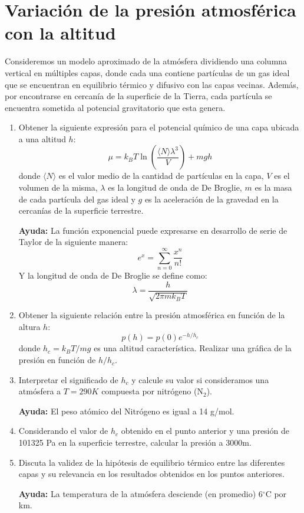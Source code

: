 \documentclass[a4paper,11pt]{article}
\begin{document}
\section{Variación de la presión atmosférica con la altitud}

Consideremos un modelo aproximado de la atmósfera dividiendo una
columna vertical en múltiples capas, donde cada una contiene partículas
de un gas ideal que se encuentran en equilibrio térmico y difusivo con
las capas vecinas. Además, por encontrarse en cercanía de la superficie
de la Tierra, cada partícula se encuentra sometida al potencial
gravitatorio que esta genera.


\begin{enumerate}[label=(\alph*),
                  leftmargin=2\parindent,
                  rightmargin=2\parindent]

    \item{Obtener la siguiente expresión para el potencial químico de
          una capa ubicada a una altitud $h$:
          $$ \mu =
          k_B T \ln \left( \frac{\langle N \rangle \lambda^3}{V} \right)
          + mgh $$
          donde $\langle N \rangle$ es el valor medio de la cantidad de
          partículas en la capa, $V$ es el volumen de la misma,
          $\lambda$ es la longitud de onda de De Broglie, $m$ es la
          masa de cada partícula del gas ideal y $g$ es la aceleración
          de la gravedad en la cercanías de la superficie terrestre.
          }

    {\small
    \textbf{Ayuda:}
    La función exponencial puede expresarse en desarrollo de serie de
    Taylor de la siguiente manera:
    $$ e^x = \sum_{n=0}^\infty \frac{x^n}{n!} $$
    Y la longitud de onda de De Broglie se define como:
    $$ \lambda = \frac{h}{\sqrt{2\pi m k_B T}} $$
    }

    \item{Obtener la siguiente relación entre la presión atmosférica
          en función de la altura $h$:
          $$ p(h) = p(0) e^{-h/h_c} $$
          donde $h_c = k_B T / mg$ es una altitud característica.
          Realizar una gráfica de la presión en función de $h/h_c$.
          }

    \item{Interpretar el significado de $h_c$ y calcule su valor si
          consideramos una atmósfera a $T = 290 K$ compuesta por
          nitrógeno (N$_2$).}

    {\small
    \textbf{Ayuda:}
    El peso atómico del Nitrógeno es igual a 14 g/mol.
    }

    \item{Considerando el valor de $h_c$ obtenido en el punto anterior
          y una presión de 101325 Pa en la superficie terrestre,
          calcular la presión a 3000m.}

    \item{Discuta la validez de la hipótesis de equilibrio térmico
          entre las diferentes capas y su relevancia en los resultados
          obtenidos en los puntos anteriores.}

    {\small
    \textbf{Ayuda:}
    La temperatura de la atmósfera desciende (en promedio) 6$^\circ$C
    por km.
    }

\end{enumerate}
\end{document}
